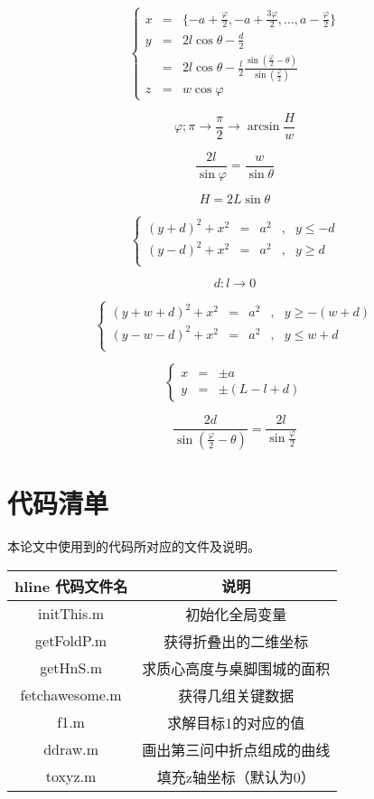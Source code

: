 $$\left\{ \begin{array}{lll}
 x & = & \{-a + \frac{\varphi}{2},-a + \frac{3\varphi}{2},\dots,a - \frac{\varphi}{2}\}  \\
 y & = & 2l\cos \theta-\frac{d}{2}\\
   & = & 2l\cos \theta - \frac{l}{2}\frac{\sin(\frac{\varphi}{2}-\theta)}{\sin(\frac{\varphi}{2})}\\
 z & = & w \cos \varphi 
\end{array}$$

$$\varphi ; \pi \rightarrow \frac{\pi}{2} \rightarrow \arcsin\frac{H}{w}$$

$$\frac{2l}{\sin\varphi} = \frac{w}{\sin\theta}$$

$$H=2L\sin\theta$$

$$\left\{\begin{array}{lllll}
(y+d)^2+x^2 &=& a^2&,&y\leq -d\\
(y-d)^2+x^2 &=& a^2&,&y\geq d \\
\end{array}$$

$$d:l\rightarrow 0$$

$$\left\{\begin{array}{lllll}
(y+w+d)^2+x^2 &=& a^2&,&y\geq -(w+d)\\
(y-w-d)^2+x^2 &=& a^2&,&y\leq w+d \\
\end{array}$$

$$\left\{\begin{array}{lll}
x &=& \pm a\\
y &=& \pm(L-l+d)
\end{array}$$

$$\frac{2d}{\sin(\frac{\varphi}{2}-\theta)}=\frac{2l}{\sin\frac{\varphi}{2}}$$


\section{代码清单}
本论文中使用到的代码所对应的文件及说明。

\begin{center}
    
    \begin{tabular}{c|c}hline 代码文件名 & 说明 \\ 
        \hline initThis.m & 初始化全局变量 \\ 
        \hline getFoldP.m & 获得折叠出的二维坐标\\
        \hline getHnS.m & 求质心高度与桌脚围城的面积 \\
        \hline fetchawesome.m & 获得几组关键数据 \\
        \hline f1.m & 求解目标1的对应的值 \\
        \hline ddraw.m & 画出第三问中折点组成的曲线 \\
        \hline toxyz.m & 填充z轴坐标（默认为0）\\
        \hline 
    \end{tabular}
\end{center} 
